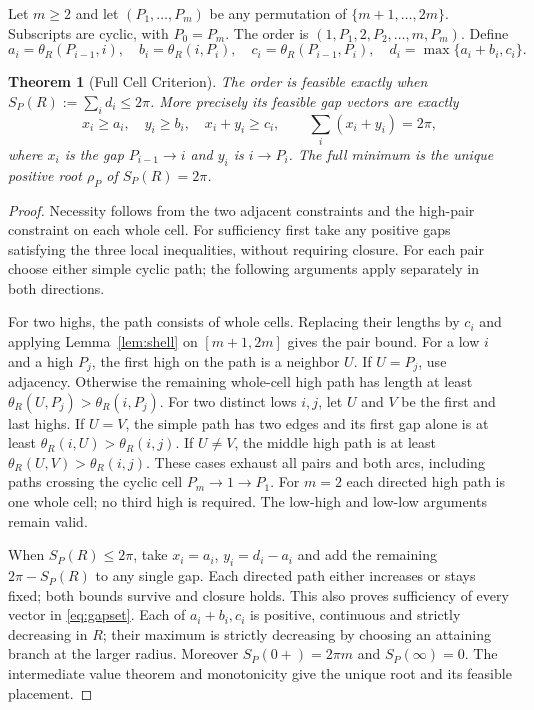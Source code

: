 \documentclass[11pt,letterpaper]{article}
\newtheorem{theorem}{Theorem}[section]
\newcommand{\thR}{\theta_R}
\begin{document}
Let $m\ge2$ and let $(P_1,\ldots,P_m)$ be any permutation of
$\{m+1,\ldots,2m\}$. Subscripts are cyclic, with $P_0=P_m$.
The order is $(1,P_1,2,P_2,\ldots,m,P_m)$. Define
\begin{equation}\label{eq:cells}
 a_i=\thR(P_{i-1},i),\quad b_i=\thR(i,P_i),\quad
 c_i=\thR(P_{i-1},P_i),\quad d_i=\max\{a_i+b_i,c_i\}.
\end{equation}
\begin{theorem}[Full Cell Criterion]\label{thm:cells}
The order is feasible exactly when $S_P(R):=\sum_i d_i\le2\pi$.
More precisely its feasible gap vectors are exactly
\begin{equation}\label{eq:gapset}
 x_i\ge a_i,\quad y_i\ge b_i,\quad x_i+y_i\ge c_i,
 \qquad\sum_i(x_i+y_i)=2\pi,
\end{equation}
where $x_i$ is the gap $P_{i-1}\to i$ and $y_i$ is $i\to P_i$.
The full minimum is the unique positive root $\rho_P$ of $S_P(R)=2\pi$.
\end{theorem}
\begin{proof}
Necessity follows from the two adjacent constraints and the high-pair
constraint on each whole cell. For sufficiency first take any positive
gaps satisfying the three local inequalities, without requiring closure.
For each pair choose either simple cyclic path; the following arguments
apply separately in both directions.

For two highs, the path consists of whole cells. Replacing their lengths
by $c_i$ and applying Lemma~\ref{lem:shell} on $[m+1,2m]$ gives the
pair bound. For a low $i$ and a high $P_j$, the first high on the path is
a neighbor $U$. If $U=P_j$, use adjacency. Otherwise the remaining
whole-cell high path has length at least $\thR(U,P_j)>\thR(i,P_j)$.
For two distinct lows $i,j$, let $U$ and $V$ be the first and last highs.
If $U=V$, the simple path has two edges and its first gap alone is at
least $\thR(i,U)>\thR(i,j)$. If $U\ne V$, the middle high path is at
least $\thR(U,V)>\thR(i,j)$. These cases exhaust all pairs and both arcs,
including paths crossing the cyclic cell $P_m\to1\to P_1$.
For $m=2$ each directed high path is one whole cell; no third high is
required. The low-high and low-low arguments remain valid.

When $S_P(R)\le2\pi$, take $x_i=a_i$, $y_i=d_i-a_i$ and add the
remaining $2\pi-S_P(R)$ to any single gap. Each directed path either
increases or stays fixed; both bounds survive and closure holds. This
also proves sufficiency of every vector in \eqref{eq:gapset}.
Each of $a_i+b_i,c_i$ is positive, continuous and strictly decreasing
in $R$; their maximum is strictly decreasing by choosing an attaining
branch at the larger radius. Moreover $S_P(0+)=2\pi m$ and
$S_P(\infty)=0$. The intermediate value theorem and monotonicity give
the unique root and its feasible placement.
\end{proof}
\end{document}
